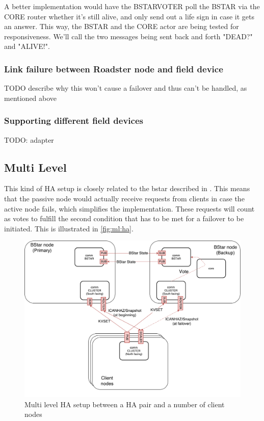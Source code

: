 A better implementation would have the BSTARVOTER poll the BSTAR via the CORE
router whether it's still alive, and only send out a life sign in case it gets
an answer. This way, the BSTAR and the CORE actor are being tested for
responsiveness. We'll call the two messages being sent back and forth "DEAD?"
and "ALIVE!".

\subsubsection{Link failure between Roadster node and field device}
TODO describe why this won't cause a failover and thus can't be handled, as
mentioned above\\

\subsubsection{Supporting different field devices}
TODO: adapter

\subsection{Multi Level}
This kind of \gls{HA} setup is closely related to the \gls{bstar} described
in \cite[Chapter 4 - Reliable Request-Reply Patterns, High-Availability Pair
(Binary Star Pattern)]{zmq:zguide}. This means that the passive node would
actually receive requests from clients in case the active node fails, which
simplifies the implementation. These requests will count as votes to fulfill
the second condition that has to be met for a failover to be initiated. This is
illustrated in \autoref{fig:ml:ha}.

\begin{figure}[]
	\includegraphics[width=\textwidth]{img/ML-HA_bstar.pdf}
	\caption{Multi level HA setup between a HA pair and a number of client nodes}
	\label{fig:ml:ha}
\end{figure}

